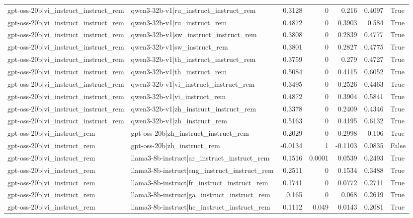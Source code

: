 \begin{table}
\begin{tabular}{l l r r r r l}
gpt-oss-20b|vi_instruct_instruct_rem & qwen3-32b-v1|ru_instruct_instruct_rem & 0.3128 & 0 & 0.216 & 0.4097 & True \\
gpt-oss-20b|vi_instruct_instruct_rem & qwen3-32b-v1|ru_instruct_rem & 0.4872 & 0 & 0.3903 & 0.584 & True \\
gpt-oss-20b|vi_instruct_instruct_rem & qwen3-32b-v1|sw_instruct_instruct_rem & 0.3808 & 0 & 0.2839 & 0.4777 & True \\
gpt-oss-20b|vi_instruct_instruct_rem & qwen3-32b-v1|sw_instruct_rem & 0.3801 & 0 & 0.2827 & 0.4775 & True \\
gpt-oss-20b|vi_instruct_instruct_rem & qwen3-32b-v1|th_instruct_instruct_rem & 0.3759 & 0 & 0.279 & 0.4727 & True \\
gpt-oss-20b|vi_instruct_instruct_rem & qwen3-32b-v1|th_instruct_rem & 0.5084 & 0 & 0.4115 & 0.6052 & True \\
gpt-oss-20b|vi_instruct_instruct_rem & qwen3-32b-v1|vi_instruct_instruct_rem & 0.3495 & 0 & 0.2526 & 0.4463 & True \\
gpt-oss-20b|vi_instruct_instruct_rem & qwen3-32b-v1|vi_instruct_rem & 0.4872 & 0 & 0.3904 & 0.5841 & True \\
gpt-oss-20b|vi_instruct_instruct_rem & qwen3-32b-v1|zh_instruct_instruct_rem & 0.3378 & 0 & 0.2409 & 0.4346 & True \\
gpt-oss-20b|vi_instruct_instruct_rem & qwen3-32b-v1|zh_instruct_rem & 0.5163 & 0 & 0.4195 & 0.6132 & True \\
gpt-oss-20b|vi_instruct_rem & gpt-oss-20b|zh_instruct_instruct_rem & -0.2029 & 0 & -0.2998 & -0.106 & True \\
gpt-oss-20b|vi_instruct_rem & gpt-oss-20b|zh_instruct_rem & -0.0134 & 1 & -0.1103 & 0.0835 & False \\
gpt-oss-20b|vi_instruct_rem & llama3-8b-instruct|ar_instruct_instruct_rem & 0.1516 & 0.0001 & 0.0539 & 0.2493 & True \\
gpt-oss-20b|vi_instruct_rem & llama3-8b-instruct|eng_instruct_instruct_rem & 0.2511 & 0 & 0.1534 & 0.3488 & True \\
gpt-oss-20b|vi_instruct_rem & llama3-8b-instruct|fr_instruct_instruct_rem & 0.1741 & 0 & 0.0772 & 0.2711 & True \\
gpt-oss-20b|vi_instruct_rem & llama3-8b-instruct|ga_instruct_instruct_rem & 0.165 & 0 & 0.068 & 0.2619 & True \\
gpt-oss-20b|vi_instruct_rem & llama3-8b-instruct|he_instruct_instruct_rem & 0.1112 & 0.049 & 0.0143 & 0.2081 & True \\

\end{tabular}
\end{table}
